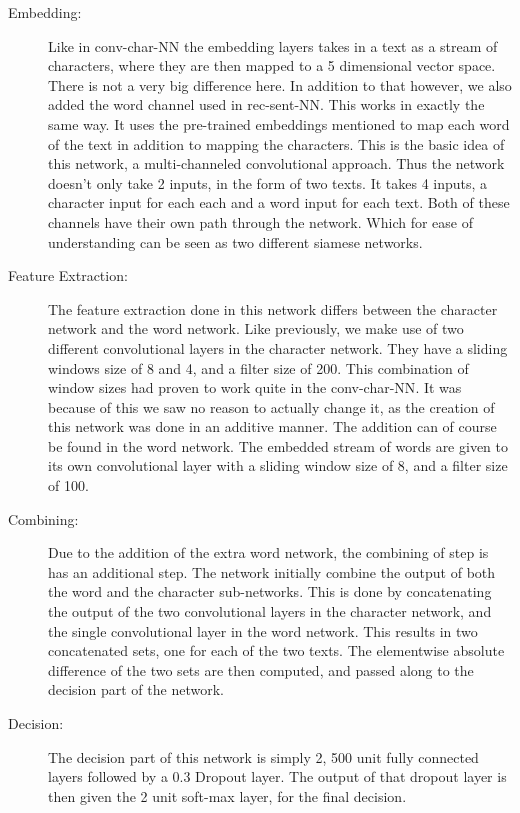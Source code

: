 \begin{description}

    \item[Embedding:]

    Like in \gls{conv-char-NN} the embedding layers takes in a text as a
    stream of characters, where they are then mapped to a 5 dimensional vector
    space. There is not a very big difference here. In addition to that however,
    we also added the word channel used in \gls{rec-sent-NN}. This works in
    exactly the same way. It uses the pre-trained embeddings mentioned to map
    each word of the text in addition to mapping the characters. This is the
    basic idea of this network, a multi-channeled convolutional approach. Thus
    the network doesn't only take 2 inputs, in the form of two texts. It takes 4
    inputs, a character input for each each and a word input for each text. Both
    of these channels have their own path through the network. Which for ease of
    understanding can be seen as two different siamese networks.

    \item[Feature Extraction:]

    The feature extraction done in this network differs between the character
    network and the word network. Like previously, we make use of two different
    convolutional layers in the character network. They have a sliding windows
    size of 8 and 4, and a filter size of 200. This combination of window sizes
    had proven to work quite in the \gls{conv-char-NN}. It was because of this
    we saw no reason to actually change it, as the creation of this network was
    done in an additive manner. The addition can of course be found in the word
    network. The embedded stream of words are given to its own convolutional
    layer with a sliding window size of 8, and a filter size of 100.

    \item[Combining:]

    Due to the addition of the extra word network, the combining of step is
    has an additional step. The network initially combine the output of both
    the word and the character sub-networks. This is done by concatenating
    the output of the two convolutional layers in the character network, and
    the single convolutional layer in the word network. This results in two
    concatenated sets, one for each of the two texts. The elementwise absolute
    difference of the two sets are then computed, and passed along to the
    decision part of the network.

    \item[Decision:]

    The decision part of this network is simply 2, 500 unit fully connected
    layers followed by a 0.3 Dropout layer. The output of that dropout layer
    is then given the 2 unit soft-max layer, for the final decision.


\end{description}
    




